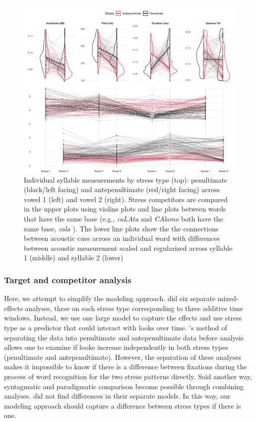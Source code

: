 \begin{figure}[H]
  \centering
  \includegraphics[width=1\linewidth]{visuals/raw_acoustics_combined.jpeg}
  \caption{Individual syllable measurements by stress type (top): penultimate (black/left facing) and antepenultimate (red/right facing)  across vowel 1 (left) and vowel 2 (right). Stress competitors are compared in the upper plots using violins plots and line plots between words that have the same base (e.g., \textit{caLAta} and \textit{CAlamo} both have the same base, \textit{cala} ). The lower line plots show the the connections between acoustic cues across an individual word with differences between acoustic measurement scaled and regularized across syllable 1 (middle) and syllable 2 (lower)}
  \label{fig:raw_acoustics}
\end{figure}


\subsubsection{Target and competitor analysis}
Here, we attempt to simplify the modeling approach. \cite{Sulpizio_McQueen_2012} did six separate mixed-effects analyses, three on each stress type corresponding to three additive time windows. Instead, we use one large model to capture the effects and use stress type as a predictor that could interact with looks over time. \cite{Sulpizio_McQueen_2012}'s method of separating the data into penultimate and antepenultimate data before analysis allows one to examine if looks increase independently in both stress types (penultimate and antepenultimate). However, the separation of these analyses makes it impossible to know if there is a difference between fixations during the process of word recognition for the two stress patterns directly. Said another way, syntagmatic and paradigmatic comparison become possible through combining analyses. \cite{Sulpizio_McQueen_2012} did not find differences in their separate models. In this way, our modeling approach should capture a difference between stress types if there is one. 

